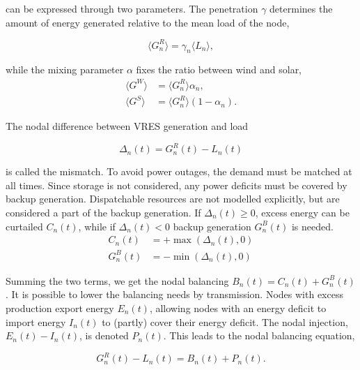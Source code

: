 \documentclass[a4paper, 12pt, sort&compress]{elsarticle}%
\newcommand{\mean}[1]{\langle #1 \rangle}
\newcommand{\paren}[1]{\left(#1\right)}
\begin{document}
can be expressed through two parameters. The penetration $\gamma$
determines the amount of energy generated relative to the mean load of
the node,

\begin{equation}
  \mean{G^{R}_{n}} = \gamma_{n} \mean{L_{n}} ,
\end{equation} 

while the mixing parameter $\alpha$ fixes the ratio between wind and solar,
\begin{align}
  \mean{G^{W}} &= \mean{G_{n}^{R}} \alpha_{n}  , \\
  \mean{G^{S}} &= \mean{G_{n}^{R}} \paren{1- \alpha_{n}}  .
\end{align} 

The nodal difference between VRES generation and load

\begin{equation}
  \Delta_{n}(t) = G^{R}_{n}(t) - L_{n}(t)
\end{equation}

is called the mismatch. To avoid power outages, the demand must be
matched at all times. Since storage is not considered, any power
deficits must be covered by backup generation. Dispatchable
resources are not modelled explicitly, but are considered a part of
the backup generation. If $\Delta_{n}(t) \geq 0$, excess energy can be
curtailed $C_{n}(t)$, while if $\Delta_{n}(t) < 0$ backup generation
$G^{B}_{n}(t)$ is needed.
\begin{align}
  C_{n}(t) &= + \max \paren{\Delta_{n}(t),0} \\
  G^{B}_{n}(t) &= - \min \phantom{} \paren{\Delta_{n}(t),0} 
\end{align}

Summing the two terms, we get the nodal balancing
$B_{n}(t) = C_{n}(t) + G^{B}_{n}(t)$.  It is possible to lower the
balancing needs by transmission. Nodes with excess production export
energy $E_{n}(t)$, allowing nodes with an energy deficit to import
energy $I_{n}(t)$ to (partly) cover their energy deficit. The nodal
injection, $E_{n}(t) - I_{n}(t)$, is denoted $P_{n}(t)$. This leads to
the nodal balancing equation,

\begin{equation}
  \label{eq:nodal-balancing}
  G^{R}_{n}(t) - L_{n}(t) = B_{n}(t) + P_{n}(t) .
\end{equation}
\end{document}
